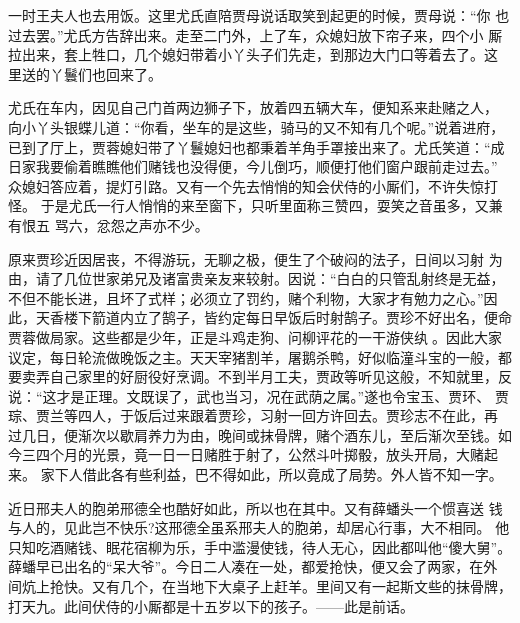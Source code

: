 一时王夫人也去用饭。这里尤氏直陪贾母说话取笑到起更的时候，贾母说：“你
也过去罢。”尤氏方告辞出来。走至二门外，上了车，众媳妇放下帘子来，四个小
厮拉出来，套上牲口，几个媳妇带着小丫头子们先走，到那边大门口等着去了。这
里送的丫鬟们也回来了。

尤氏在车内，因见自己门首两边狮子下，放着四五辆大车，便知系来赴赌之人，
向小丫头银蝶儿道：“你看，坐车的是这些，骑马的又不知有几个呢。”说着进府，
已到了厅上，贾蓉媳妇带了丫鬟媳妇也都秉着羊角手罩接出来了。尤氏笑道：“成
日家我要偷着瞧瞧他们赌钱也没得便，今儿倒巧，顺便打他们窗户跟前走过去。”
众媳妇答应着，提灯引路。又有一个先去悄悄的知会伏侍的小厮们，不许失惊打怪。
于是尤氏一行人悄悄的来至窗下，只听里面称三赞四，耍笑之音虽多，又兼有恨五
骂六，忿怨之声亦不少。

原来贾珍近因居丧，不得游玩，无聊之极，便生了个破闷的法子，日间以习射
为由，请了几位世家弟兄及诸富贵亲友来较射。因说：“白白的只管乱射终是无益，
不但不能长进，且坏了式样；必须立了罚约，赌个利物，大家才有勉力之心。”因
此，天香楼下箭道内立了鹄子，皆约定每日早饭后时射鹄子。贾珍不好出名，便命
贾蓉做局家。这些都是少年，正是斗鸡走狗、问柳评花的一干游侠纨。因此大家
议定，每日轮流做晚饭之主。天天宰猪割羊，屠鹅杀鸭，好似临潼斗宝的一般，都
要卖弄自己家里的好厨役好烹调。不到半月工夫，贾政等听见这般，不知就里，反
说：“这才是正理。文既误了，武也当习，况在武荫之属。”遂也令宝玉、贾环、
贾琮、贾兰等四人，于饭后过来跟着贾珍，习射一回方许回去。贾珍志不在此，再
过几日，便渐次以歇肩养力为由，晚间或抹骨牌，赌个酒东儿，至后渐次至钱。如
今三四个月的光景，竟一日一日赌胜于射了，公然斗叶掷骰，放头开局，大赌起来。
家下人借此各有些利益，巴不得如此，所以竟成了局势。外人皆不知一字。

近日邢夫人的胞弟邢德全也酷好如此，所以也在其中。又有薛蟠头一个惯喜送
钱与人的，见此岂不快乐?这邢德全虽系邢夫人的胞弟，却居心行事，大不相同。
他只知吃酒赌钱、眠花宿柳为乐，手中滥漫使钱，待人无心，因此都叫他“傻大舅”。
薛蟠早已出名的“呆大爷”。今日二人凑在一处，都爱抢快，便又会了两家，在外
间炕上抢快。又有几个，在当地下大桌子上赶羊。里间又有一起斯文些的抹骨牌，
打天九。此间伏侍的小厮都是十五岁以下的孩子。——此是前话。

